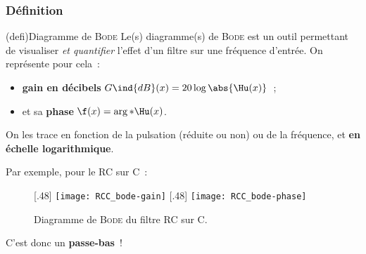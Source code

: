 \documentclass[../../main/main.tex]{subfiles}
\begin{document}
\subsubsection{Définition}
\begin{tcb*}(defi){Diagramme de \textsc{Bode}}
	Le(s) diagramme(s) de \textsc{Bode} est un outil permettant de visualiser
	\textit{et quantifier} l'effet d'un filtre sur une fréquence d'entrée. On
	représente pour cela~:
	\begin{itemize}
		\item \textbf{gain en décibels} $G\ind{dB}(x) = 20 \log \abs{\Hu(x)}$~;
		\item et sa \textbf{phase} $\f(x) = \arg*{{\Hu(x}})$.
	\end{itemize}
	\smallbreak
	On les trace en fonction de la pulsation (réduite ou non) ou de la fréquence,
	et \textbf{en échelle logarithmique}.
\end{tcb*}
Par exemple, pour le RC sur C~:
\begin{figure}[htbp!]
	\centering
	[.48\linewidth]
	{\texttt{[image: RCC\_bode-gain]}}
	[.48\linewidth]
	{\texttt{[image: RCC\_bode-phase]}}
	\caption{Diagramme de \textsc{Bode} du filtre RC sur C.}
	\label{fig:rccbode}
\end{figure}
C'est donc un \textbf{passe-bas}~!
\end{document}
